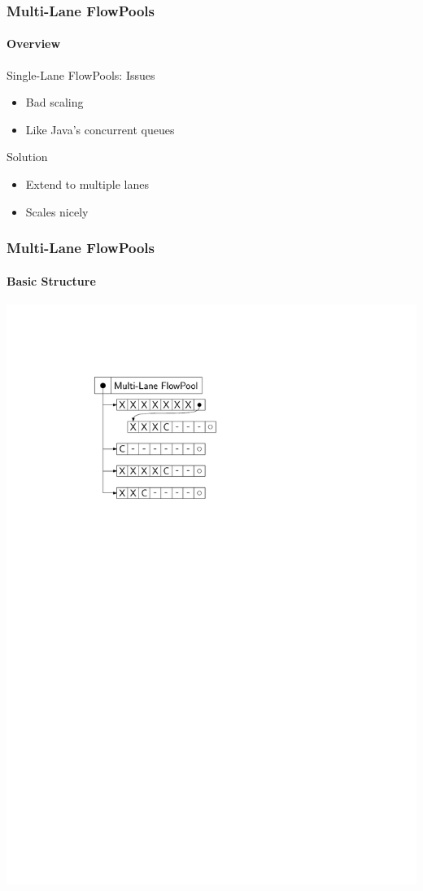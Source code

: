 \documentclass{beamer}
\begin{document}
\begin{frame}
  \frametitle{Multi-Lane FlowPools}
  \framesubtitle{Overview}

  \begin{block}{Single-Lane FlowPools: Issues}
    \begin{itemize}
    \item Bad scaling
    \item Like Java's concurrent queues
    \end{itemize}
  \end{block}

  \begin{block}{Solution}
    \begin{itemize}
    \item Extend to multiple lanes
    \item Scales nicely
    \end{itemize}
  \end{block}

\end{frame}

\begin{frame}
  \frametitle{Multi-Lane FlowPools}
  \framesubtitle{Basic Structure}
  \begin{center}
    \includegraphics{figs/MLFP}
  \end{center}
\end{frame}
\end{document}
